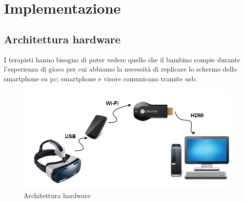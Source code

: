 \section{Implementazione} \label{sec:tecn}

\subsection{Architettura hardware} \label{subsec:hard}
I terapisti hanno bisogno di poter vedere quello che il bambino compie durante l'esperienza di gioco per cui abbiamo la necessità di replicare lo schermo dello smartphone su pc; smartphone e visore comunicano tramite \acs{usb}.
\vspace{70pt}
\begin{figure}[htbp]
\centering
\includegraphics[width=\textwidth]{Images/hardware}
\caption{Architettura hardware}
\label{fig:hardware}
\end{figure}
\clearpage

